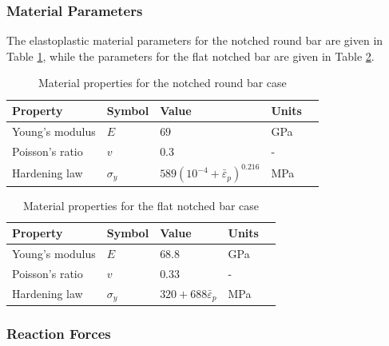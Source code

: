 \documentclass[sn-mathphys,Numbered]{sn-jnl}%
\begin{document}
%

\subsubsection{Material Parameters}

The elastoplastic material parameters for the notched round bar are given in Table \ref{tab:notched_bar_mat}, while the parameters for the flat notched bar are given in Table \ref{tab:flat_bar_mat}.
\begin{table}[htb]
	\centering
		\begin{tabular}{lllll} \hline
			Property & Symbol & Value  & Units \\ \hline 
			Young's modulus & $E$ & $69$ & GPa \\
			Poisson's ratio & $v$ & $0.3$  & - \\
			Hardening law & $\sigma_y$ & $589({10^{-4}+\bar{\varepsilon}}_p)^{0.216}$ & MPa  \\
			\hline
		\end{tabular}
	\caption{Material properties for the notched round bar case}
	\label{tab:notched_bar_mat}
\end{table}
\begin{table}[htb]
	\centering
		\begin{tabular}{lllll} \hline
			Property & Symbol & Value & Units  \\ \hline 
			Young's modulus & $E$ & $68.8$ & GPa \\
			Poisson's ratio & $v$ & $0.33$   & -\\
			Hardening law & $\sigma_y$ & $320+688\bar{\varepsilon}_p$ & MPa  \\
			\hline
		\end{tabular}
	\caption{Material properties for the flat notched bar case}
	\label{tab:flat_bar_mat}
\end{table}



\subsubsection{Reaction Forces}
\end{document}
